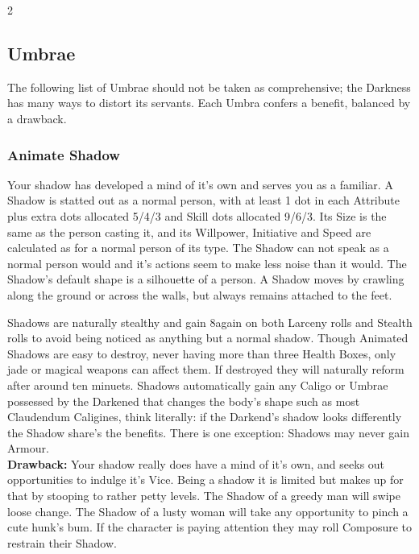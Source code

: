 \begin{multicols}{2}

\subsection*{Umbrae}
\label{subsec:Umbrae}
The following list of Umbrae should not be taken as comprehensive; the Darkness has many ways to distort its servants. Each Umbra confers a benefit, balanced by a drawback. 

\subsubsection*{Animate Shadow}
Your shadow has developed a mind of it's own and serves you as a familiar. A Shadow is statted out as a normal person, with at least 1 dot in each Attribute plus extra dots allocated 5/4/3 and Skill dots allocated 9/6/3. Its Size is the same as the person casting it, and its Willpower, Initiative and Speed are calculated as for a normal person of its type. The Shadow can not speak as a normal person would and it's actions seem to make less noise than it would. The Shadow's default shape is a silhouette of a person. A Shadow moves by crawling along the ground or across the walls, but always remains attached to the feet.

Shadows are naturally stealthy and gain 8again on both Larceny rolls and Stealth rolls to avoid being noticed as anything but a normal shadow. Though Animated Shadows are easy to destroy, never having more than three Health Boxes, only jade or magical weapons can affect them. If destroyed they will naturally reform after around ten minuets. Shadows automatically gain any Caligo or Umbrae possessed by the Darkened that changes the body's shape such as most Claudendum Caligines, think literally: if the Darkend's shadow looks differently the Shadow share's the benefits. There is one exception: Shadows may never gain Armour. \\

\noindent \textbf{Drawback:} Your shadow really does have a mind of it's own, and seeks out opportunities to indulge it's Vice. Being a shadow it is limited but makes up for that by stooping to rather petty levels. The Shadow of a greedy man will swipe loose change. The Shadow of a lusty woman will take any opportunity to pinch a cute hunk's bum. If the character is paying attention they may roll Composure to restrain their Shadow. 


\end{multicols}
